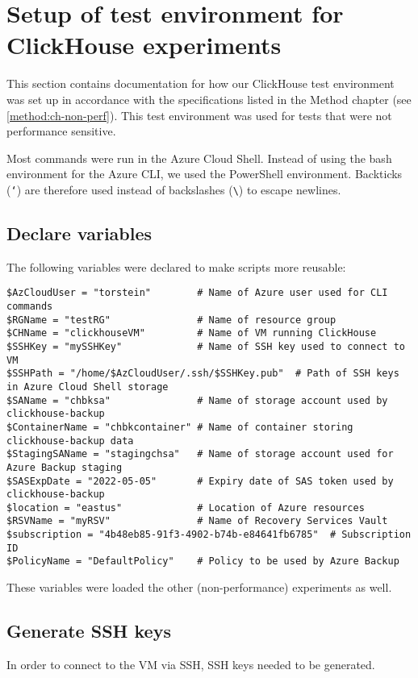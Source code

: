 \section{Setup of test environment for ClickHouse experiments} 
\label{app:ch-non-perf}
This section contains documentation for how our ClickHouse test environment was set up
in accordance with the specifications listed in the Method chapter (see \ref{method:ch-non-perf}).
This test environment was used for tests that were not performance sensitive.

Most commands were run in the Azure Cloud Shell.
Instead of using the bash environment for the Azure CLI,
we used the PowerShell environment.
Backticks (\texttt{`}) are therefore used instead of backslashes (\texttt{\textbackslash{}}) to escape newlines.

\subsection{Declare variables}
\label{sec:org92d6807}
The following variables were declared to make scripts more reusable:
\begin{verbatim}
$AzCloudUser = "torstein"        # Name of Azure user used for CLI commands
$RGName = "testRG"               # Name of resource group
$CHName = "clickhouseVM"         # Name of VM running ClickHouse
$SSHKey = "mySSHKey"             # Name of SSH key used to connect to VM
$SSHPath = "/home/$AzCloudUser/.ssh/$SSHKey.pub"  # Path of SSH keys in Azure Cloud Shell storage
$SAName = "chbksa"               # Name of storage account used by clickhouse-backup
$ContainerName = "chbkcontainer" # Name of container storing clickhouse-backup data
$StagingSAName = "stagingchsa"   # Name of storage account used for Azure Backup staging
$SASExpDate = "2022-05-05"       # Expiry date of SAS token used by clickhouse-backup
$location = "eastus"             # Location of Azure resources
$RSVName = "myRSV"               # Name of Recovery Services Vault
$subscription = "4b48eb85-91f3-4902-b74b-e84641fb6785"  # Subscription ID
$PolicyName = "DefaultPolicy"    # Policy to be used by Azure Backup
\end{verbatim}

These variables were loaded the other (non-performance) experiments as well.

\subsection{Generate SSH keys}
\label{sec:org07a6fff}
In order to connect to the VM via SSH, SSH keys needed to be generated.

